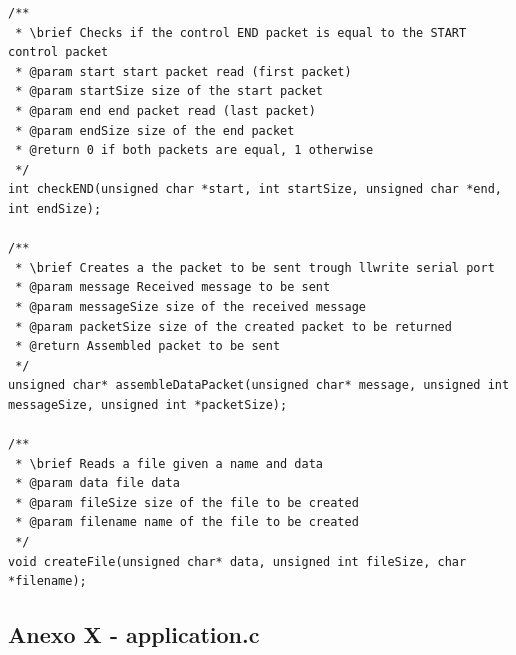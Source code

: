 \documentclass[11pt]{article}
\begin{document}
\begin{lstlisting}[style=CStyle]
/**
 * \brief Checks if the control END packet is equal to the START control packet
 * @param start start packet read (first packet)
 * @param startSize size of the start packet
 * @param end end packet read (last packet)
 * @param endSize size of the end packet
 * @return 0 if both packets are equal, 1 otherwise
 */
int checkEND(unsigned char *start, int startSize, unsigned char *end, int endSize);

/**
 * \brief Creates a the packet to be sent trough llwrite serial port
 * @param message Received message to be sent
 * @param messageSize size of the received message
 * @param packetSize size of the created packet to be returned
 * @return Assembled packet to be sent
 */
unsigned char* assembleDataPacket(unsigned char* message, unsigned int messageSize, unsigned int *packetSize);

/**
 * \brief Reads a file given a name and data
 * @param data file data
 * @param fileSize size of the file to be created
 * @param filename name of the file to be created
 */
void createFile(unsigned char* data, unsigned int fileSize, char *filename);
\end{lstlisting}

\pagebreak

\subsection{ Anexo X - application.c}
\end{document}
